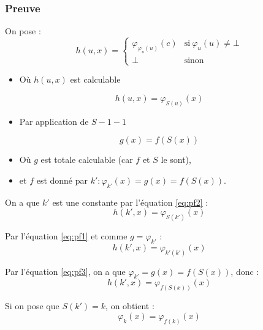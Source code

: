 \subsubsection{Preuve}

On pose :
\begin{equation}\label{eq:pf1}
h(u,x) =
\begin{cases}
	\varphi_{\varphi_u(u)}(c) & \text{si}\ \varphi_u(u) \neq \bot\\
	\bot & \text{sinon}
\end{cases}
\end{equation}
\begin{itemize}
\item[] Où $h(u,x)$ est calculable
\end{itemize}
\begin{equation}\label{eq:pf2}
h(u,x) = \varphi_{S(u)}(x)
\end{equation}
\begin{itemize}
\item[] Par application de $S-1-1$
\end{itemize}
\begin{equation}\label{eq:pf3}
g(x) = f(S(x))
\end{equation}
\begin{itemize}
\item[] Où $g$ est totale calculable (car $f$ et $S$ le sont),
\item[] et $f$ est donné par $k' : \varphi_{k'}(x) = g(x) = f(S(x))$.
\end{itemize}

\medskip

On a que $k'$ est une constante par l'équation \ref{eq:pf2} :
\begin{equation*}
h(k',x) = \varphi_{S(k')}(x)
\end{equation*}

Par l'équation \ref{eq:pf1} et comme $g = \varphi_{k'}$ :
\begin{equation*}
h(k',x) = \varphi_{k'(k')}(x)
\end{equation*}

Par l'équation \ref{eq:pf3}, on a que $\varphi_{k'} = g(x) = f(S(x))$, donc :
\begin{equation*}
h(k',x) = \varphi_{f(S(x))}(x)
\end{equation*}

Si on pose que $S(k') = k$, on obtient :
\begin{equation*}
\varphi_k(x) = \varphi_{f(k)}(x)
\end{equation*}

